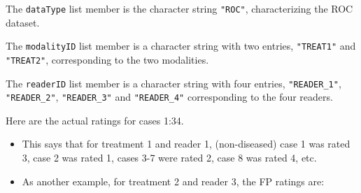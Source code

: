 \documentclass[]{book}
\newenvironment{Shaded}{\begin{snugshade}}{\end{snugshade}}
\newcommand{\CommentTok}[1]{\textcolor[rgb]{0.56,0.35,0.01}{\textit{#1}}}
\newcommand{\DecValTok}[1]{\textcolor[rgb]{0.00,0.00,0.81}{#1}}
\newcommand{\NormalTok}[1]{#1}
\newcommand{\OperatorTok}[1]{\textcolor[rgb]{0.81,0.36,0.00}{\textbf{#1}}}
\begin{document}
The \texttt{dataType} list member is the character string \texttt{"ROC"}, characterizing the ROC dataset.

\begin{Shaded}
\end{Shaded}

The \texttt{modalityID} list member is a character string with two entries, \texttt{"TREAT1"} and \texttt{"TREAT2"}, corresponding to the two modalities.

\begin{Shaded}
\end{Shaded}

The \texttt{readerID} list member is a character string with four entries, \texttt{"READER\_1"}, \texttt{"READER\_2"}, \texttt{"READER\_3"} and \texttt{"READER\_4"} corresponding to the four readers.

\begin{Shaded}
\end{Shaded}

Here are the actual ratings for cases 1:34.

\begin{Shaded}
\end{Shaded}

\begin{itemize}
\item
  This says that for treatment 1 and reader 1, (non-diseased) case 1 was rated 3, case 2 was rated 1, cases 3-7 were rated 2, case 8 was rated 4, etc.
\item
  As another example, for treatment 2 and reader 3, the FP ratings are:
\end{itemize}
\end{document}
